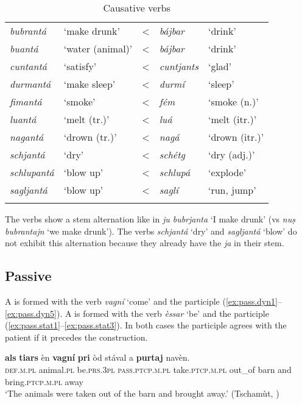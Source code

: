 \begin{table}
	\caption{Causative verbs}
	\label{factanta}
	\begin{tabular}{lllll}
		\lsptoprule
		\textit{bubrantá} &`make drunk' & < & \textit{bájbar} & `drink'\\
		\textit{buantá} & `water (animal)' & < & \textit{bájbar} & `drink'\\
		\textit{cuntantá} &`satisfy' & < & \textit{cuntjants} & `glad'\\
		\textit{durmantá} & `make sleep' & < & \textit{durmí} & `sleep'\\
		\textit{fimantá} &`smoke' & < & \textit{fém} & `smoke (n.)'\\
		\textit{luantá}	&`melt (tr.)' & < &\textit{luá} & `melt (itr.)'\\
		\textit{nagantá}	&`drown (tr.)' & < & \textit{nagá} & `drown (itr.)'\\
		\textit{schjantá} & `dry' & < & \textit{schétg} & `dry (adj.)'\\
		\textit{schlupantá} & `blow up'&	< & \textit{schlupá} & `explode'\\
		\textit{sagljantá} & `blow up' & < & \textit{saglí} & `run, jump'\\
		
		\lspbottomrule
	\end{tabular}
\end{table}

The  verbs show a stem alternation like in \textit{ju bubrjanta} `I make drunk' (vs \textit{nuṣ bubrantajn} `we make drunk'). The verbs \textit{schjantá} `dry' and \textit{sagljantá} `blow' do not exhibit this alternation because they already have the  \textit{ja} in their stem.

\subsection{Passive}\label{sec:5.5.4}
A  is formed with the verb \textit{vagní} ‘come’ and the participle (\ref{ex:pass.dyn1}--\ref{ex:pass.dyn5}). A  is formed with the verb \isi\textit{èssar} `be' and the participle (\ref{ex:pass.stat1}--\ref{ex:pass.stat3}). In both cases the participle agrees with the patient  if it precedes the  construction.

\ea
\label{ex:pass.dyn1}
\gll    [...] \textbf{als} \textbf{tiars} èn \textbf{vagní} \textbf{pri} òd stával a \textbf{purtaj} navèn.\\
{}    \textsc{def.m.pl}  animal.\textsc{pl}  be.\textsc{prs.3pl}   \textsc{pass.ptcp.m.pl}   take.\textsc{ptcp.m.pl}  out\_of barn and bring.\textsc{ptcp.m.pl}  away\\
\glt `The animals were taken out of the barn and brought away.' (Tschamùt, \citealt[53]{Büchli1966})
\z

